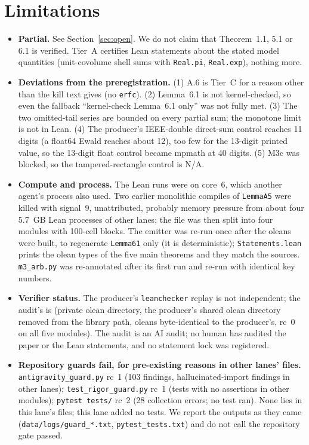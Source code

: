\documentclass[11pt]{article}
\newcommand{\lean}[1]{\texttt{#1}}
\begin{document}
\section{Limitations}\label{sec:lim}
\begin{itemize}\itemsep=1pt
\item \textbf{Partial.} See Section~\ref{sec:open}. We do not claim that Theorem~1.1, 5.1 or 6.1 is verified. Tier~A certifies Lean statements about the stated model quantities (unit-covolume shell sums with \lean{Real.pi}, \lean{Real.exp}), nothing more.
\item \textbf{Deviations from the preregistration.} (1) A.6 is Tier~C for a reason other than the kill text gives (no \lean{erfc}). (2) Lemma~6.1 is not kernel-checked, so even the fallback ``kernel-check Lemma~6.1 only'' was not fully met. (3) The two omitted-tail series are bounded on every partial sum; the monotone limit is not in Lean. (4) The producer's IEEE-double direct-sum control reaches 11 digits (a float64 Ewald reaches about 12), too few for the 13-digit printed value, so the 13-digit float control became mpmath at 40 digits. (5) M3c was blocked, so the tampered-rectangle control is N/A.
\item \textbf{Compute and process.} The Lean runs were on core~6, which another agent's process also used. Two earlier monolithic compiles of \lean{LemmaA5} were killed with signal~9, unattributed, probably memory pressure from about four 5.7~GB Lean processes of other lanes; the file was then split into four modules with 100-cell blocks. The emitter was re-run once after the oleans were built, to regenerate \lean{Lemma61} only (it is deterministic); \texttt{Statements.lean} prints the olean types of the five main theorems and they match the sources. \texttt{m3\_arb.py} was re-annotated after its first run and re-run with identical key numbers.
\item \textbf{Verifier status.} The producer's \texttt{leanchecker} replay is not independent; the audit's is (private olean directory, the producer's shared olean directory removed from the library path, oleans byte-identical to the producer's, rc~0 on all five modules). The audit is an AI audit; no human has audited the paper or the Lean statements, and no statement lock was registered.
\item \textbf{Repository guards fail, for pre-existing reasons in other lanes' files.} \texttt{antigravity\_guard.py} rc~1 (103 findings, hallucinated-import findings in other lanes); \texttt{test\_rigor\_guard.py} rc~1 (tests with no assertions in other modules); \texttt{pytest tests/} rc~2 (28 collection errors; no test ran). None lies in this lane's files; this lane added no tests. We report the outputs as they came (\texttt{data/logs/guard\_*.txt}, \texttt{pytest\_tests.txt}) and do not call the repository gate passed.

\end{itemize}
\end{document}
